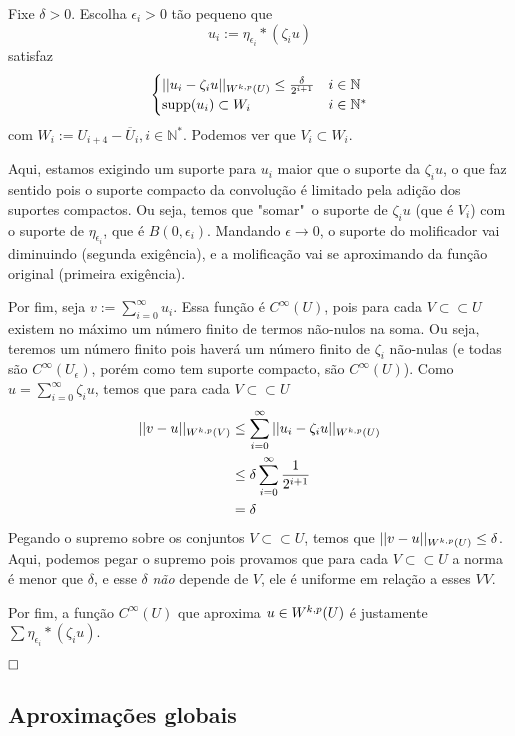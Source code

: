 \documentclass[11pt]{article}
\newcommand{\qed}{$\hfill\square$}
\newcommand{\N}{\mathbb{N}}
\newcommand{\e}{\epsilon}
\begin{document}
Fixe \( \delta>0\). Escolha \( \e_i>0 \) tão pequeno que \[ u_i := \eta_{\e_i} * \left(\zeta_iu\right) \] satisfaz \[ \begin{cases}
	||u_i - \zeta_iu||_{\sobolevdef} \leq \frac{\delta}{2^{i+1}} & i \in \N \\
	\text{supp}(u_i) \subset W_i & i \in \N^*
\end{cases} \] com \( W_i := U_{i+4} - \overline{U}_i, i \in \N^* \). Podemos ver que \( V_i \subset W_i \). 

Aqui, estamos exigindo um suporte para \( u_i \) maior que o suporte da \( \zeta_iu \), o que faz sentido pois o suporte compacto da convolução é limitado pela adição dos suportes compactos. Ou seja, temos que "somar"\ o suporte de \( \zeta_iu \) (que é \( V_i \)) com o suporte de \( \eta_{\e_i} \), que é \( B(0, \e_i) \). Mandando \( \e\rightarrow 0 \), o suporte do molificador vai diminuindo (segunda exigência), e a molificação vai se aproximando da função original (primeira exigência).

Por fim, seja $ v:=\sum_{i=0}^{\infty} u_i $. Essa função é \( C^\infty(U) \), pois para cada \( V \subset\subset U \) existem no máximo um número finito de termos não-nulos na soma. Ou seja, teremos um número finito pois haverá um número finito de \( \zeta_i \) não-nulas (e todas são \( C^\infty (U_\e) \), porém como tem suporte compacto, são \( C^\infty(U) \)). Como \( u=\sum_{i=0}^{\infty}\zeta_iu  \), temos que para cada \( V \subset\subset U \) 
\begin{align*}
	||v - u||_{W^{k,p}(V)} &\leq \sum_{i=0}^{\infty} ||u_i - \zeta_iu||_{W^{k,p}(U)} \\
	&\leq \delta  \sum_{i=0}^{\infty}  \frac{1}{2^{i+1}}\\
	&= \delta
\end{align*} Pegando o supremo sobre os conjuntos \( V \subset\subset U \), temos que \( ||v-u||_{W^{k,p}(U)} \leq \delta \). Aqui, podemos pegar o supremo pois provamos que para cada \( V \subset\subset U \) a norma é menor que \( \delta \), e esse \( \delta \) \textit{não} depende de \( V \), ele é uniforme em relação a esses \( V V\).

Por fim, a função \( C^{\infty}(U) \) que aproxima \( u \in W^{k,p}(U) \) é justamente \( \sum \eta_{\e_i} * (\zeta_i u) \).

\qed




\subsection{Aproximações globais}
\end{document}
